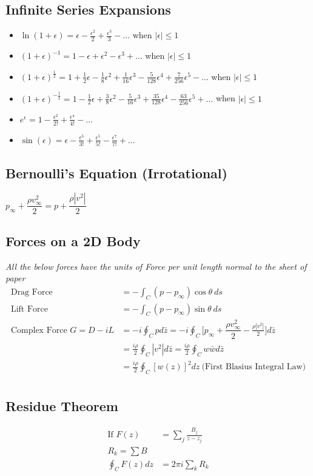 \documentclass[11pt, letterpaper, notitlepage]{article}
\begin{document}
\subsection{Infinite Series Expansions}
\begin{itemize}
  \item $\ln(1+\epsilon) = \epsilon - \frac{\epsilon^2}{2} + \frac{\epsilon^3}{3} - \dots$ when $|\epsilon| \le 1$
  \item $(1+\epsilon)^{-1} = 1 - \epsilon + \epsilon^2 - \epsilon^3 + \dots$ when $|\epsilon| \le 1$
  \item $(1+\epsilon)^{\frac{1}{2}} = 1 + \frac{1}{2} \epsilon - \frac{1}{8} \epsilon^2 + \frac{1}{16} \epsilon^3 - \frac{5}{128} \epsilon^4 + \frac{7}{256} \epsilon^5 - \dots$ when $|\epsilon| \le 1$
  \item $(1+\epsilon)^{-\frac{1}{2}} = 1 - \frac{1}{2} \epsilon + \frac{3}{8} \epsilon^2 - \frac{5}{16} \epsilon^3 + \frac{35}{128} \epsilon^4 - \frac{63}{256} \epsilon^5 + \dots$ when $|\epsilon| \le 1$
  \item $e^{\epsilon} = 1 - \frac{\epsilon^2}{2!} + \frac{\epsilon^4}{4!} - \dots$
  \item $\sin(\epsilon) = \epsilon - \frac{\epsilon^3}{3!} + \frac{\epsilon^5}{5!} - \frac{\epsilon^7}{7!} + \dots$ 
\end{itemize}

\subsection{Bernoulli's Equation (Irrotational)}
$p_{\infty} + \dfrac{\rho v^2_{\infty}}{2} = p + \dfrac{\rho |v^2|}{2} $

\subsection{Forces on a 2D Body}
\textit{All the below forces have the units of Force per unit length normal to the sheet of paper}
\begin{align*}
\text{Drag Force} &= -\int_{C}^{} (p-p_{\infty}) \cos{\theta}\ ds \\
\text{Lift Force} &= -\int_{C}^{} (p-p_{\infty}) \sin{\theta}\ ds \\
\text{Complex Force } G = D - i L &= -i \oint_{C}^{} p d\bar{z} = -i \oint_{C}^{} \Biggl[ p_{\infty} + \dfrac{\rho v^2_{\infty}}{2} -  \frac{\rho |v^2|}{2} \Biggr] d\bar{z} \\
&= \frac{i \rho}{2} \oint_{C}^{} |v^2| d\bar{z} = \frac{i \rho}{2} \oint_{C}^{} w \bar{w} d\bar{z} \\
&= \frac{i \rho}{2} \oint_{C}^{} [w(z)]^2 dz \ \bigl(\text{First Blasius Integral Law}\bigr) \\
\end{align*}

\subsection{Residue Theorem}
\begin{align*}
\text{If } F(z) &= \sum_{j}^{} \frac{B_j}{z - z_j} \\
R_k = \sum B \\
\oint_{C}^{} F(z) dz &= 2 \pi i \sum_{k}^{} R_k \\
\end{align*}
\end{document}

